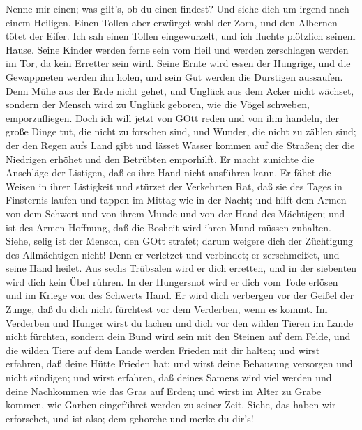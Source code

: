  Nenne mir einen; was gilt's, ob du einen findest? Und siehe
dich um irgend nach einem Heiligen.  Einen Tollen aber
erwürget wohl der Zorn, und den Albernen tötet der Eifer. 
Ich sah einen Tollen eingewurzelt, und ich fluchte plötzlich seinem
Hause.  Seine Kinder werden ferne sein vom Heil und werden
zerschlagen werden im Tor, da kein Erretter sein wird. 
Seine Ernte wird essen der Hungrige, und die Gewappneten werden ihn
holen, und sein Gut werden die Durstigen aussaufen.  Denn
Mühe aus der Erde nicht gehet, und Unglück aus dem Acker nicht wächset,
 sondern der Mensch wird zu Unglück geboren, wie die Vögel
schweben, emporzufliegen.  Doch ich will jetzt von GOtt
reden und von ihm handeln,  der große Dinge tut, die nicht
zu forschen sind, und Wunder, die nicht zu zählen sind; 
der den Regen aufs Land gibt und lässet Wasser kommen auf die Straßen;
 der die Niedrigen erhöhet und den Betrübten emporhilft.
 Er macht zunichte die Anschläge der Listigen, daß es ihre
Hand nicht ausführen kann.  Er fähet die Weisen in ihrer
Listigkeit und stürzet der Verkehrten Rat,  daß sie des
Tages in Finsternis laufen und tappen im Mittag wie in der Nacht;
 und hilft dem Armen von dem Schwert und von ihrem Munde
und von der Hand des Mächtigen;  und ist des Armen
Hoffnung, daß die Bosheit wird ihren Mund müssen zuhalten. 
Siehe, selig ist der Mensch, den GOtt strafet; darum weigere dich der
Züchtigung des Allmächtigen nicht!  Denn er verletzet und
verbindet; er zerschmeißet, und seine Hand heilet.  Aus
sechs Trübsalen wird er dich erretten, und in der siebenten wird dich
kein Übel rühren.  In der Hungersnot wird er dich vom Tode
erlösen und im Kriege von des Schwerts Hand.  Er wird dich
verbergen vor der Geißel der Zunge, daß du dich nicht fürchtest vor dem
Verderben, wenn es kommt.  Im Verderben und Hunger wirst du
lachen und dich vor den wilden Tieren im Lande nicht fürchten,
 sondern dein Bund wird sein mit den Steinen auf dem Felde,
und die wilden Tiere auf dem Lande werden Frieden mit dir halten;
 und wirst erfahren, daß deine Hütte Frieden hat; und wirst
deine Behausung versorgen und nicht sündigen;  und wirst
erfahren, daß deines Samens wird viel werden und deine Nachkommen wie
das Gras auf Erden;  und wirst im Alter zu Grabe kommen,
wie Garben eingeführet werden zu seiner Zeit.  Siehe, das
haben wir erforschet, und ist also; dem gehorche und merke du dir's!

